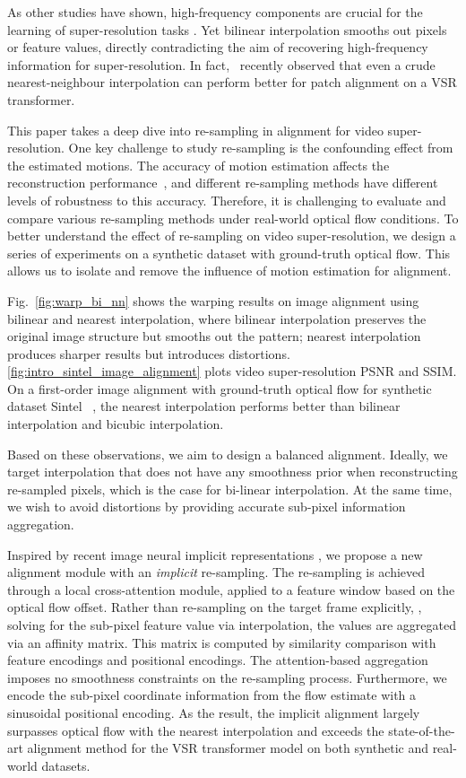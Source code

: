 \documentclass[10pt,twocolumn,letterpaper]{article}
\begin{document}
As other studies have shown, high-frequency components are crucial for the learning of super-resolution tasks \cite{ledig2017photo}.  Yet bilinear  
interpolation smooths out pixels or feature values, directly contradicting the aim of recovering high-frequency information for super-resolution. In fact,~\cite{shi2022rethinking} recently observed that even a crude nearest-neighbour interpolation can perform better for patch alignment on a VSR transformer. 

This paper takes a deep dive into re-sampling in alignment for video super-resolution.  One key challenge to study re-sampling is the confounding effect from the estimated motions. The accuracy of motion estimation affects the reconstruction performance~\cite{chan2021basicvsr}, and different re-sampling methods have different levels of robustness to this accuracy. Therefore, it is challenging to evaluate and compare various re-sampling methods under real-world optical flow conditions.
To better understand the effect of re-sampling on video super-resolution, we design a series of experiments on a synthetic dataset with ground-truth optical flow. This allows us to isolate and remove the influence of motion estimation for alignment.



Fig.~\ref{fig:warp_bi_nn}
shows the warping results on image alignment using bilinear and nearest interpolation, where bilinear interpolation preserves the original image structure but smooths out the pattern; nearest interpolation produces sharper results but introduces distortions.
\cref{fig:intro_sintel_image_alignment} plots video super-resolution PSNR and SSIM.  On a first-order image alignment with ground-truth optical flow for synthetic dataset Sintel ~\cite{butler2012naturalistic_sintel}, the nearest interpolation performs better than bilinear interpolation and bicubic interpolation.

Based on these observations, we aim to design a balanced alignment.  Ideally, we target  interpolation that does not have any smoothness prior when reconstructing re-sampled pixels, which is the case for bi-linear interpolation.  At the same time, we wish to  avoid distortions by providing accurate sub-pixel information aggregation.

Inspired by recent image neural implicit representations \cite{chen2021learning_liif, xu2021ultrasr}, we propose a new alignment module with an \emph{implicit} re-sampling.  
The re-sampling is achieved through a local cross-attention module, applied to a feature window based on the optical flow offset.  Rather than re-sampling on the target frame explicitly, \ie, solving for the sub-pixel feature value via interpolation, the values are aggregated via an affinity matrix.  This matrix is computed by similarity comparison with feature encodings and positional encodings.  The attention-based aggregation imposes no smoothness constraints on the re-sampling process.  Furthermore, we encode 
the sub-pixel coordinate information from the flow estimate with a sinusoidal positional encoding.   
As the result, the implicit alignment largely surpasses optical flow with the nearest interpolation and exceeds the state-of-the-art alignment method for the VSR transformer model on both synthetic and real-world datasets.
\end{document}
